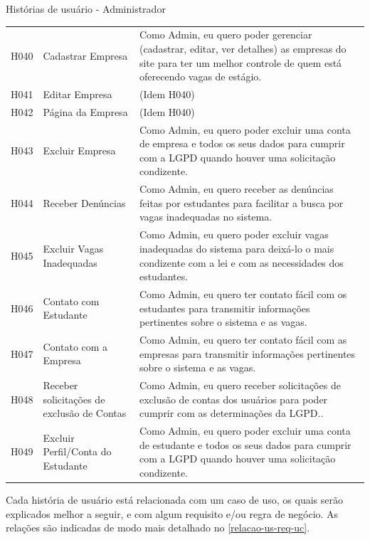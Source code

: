 \begin{quadro}[H]
	\centering
	\ABNTEXfontereduzida
	\caption{Histórias de usuário - Administrador}
	\label{user-story-admin}
	\begin{tabular}{|l|p{4 cm}|p{9 cm}|}
		\hline 
		\thead{Código} & \thead[l]{Nome} & \thead[l]{Descrição} \\
		\hline
		H040 & Cadastrar Empresa & Como Admin, eu quero poder gerenciar (cadastrar, editar, ver detalhes) as empresas do site para ter um melhor controle de quem está oferecendo vagas de estágio. \\
		\hline
		H041 & Editar Empresa & (Idem H040) \\
		\hline
		H042 & Página da Empresa & (Idem H040) \\
		\hline
		H043 & Excluir Empresa & Como Admin, eu quero poder excluir uma conta de empresa e todos os seus dados para cumprir com a LGPD quando houver uma solicitação condizente. \\
		\hline
		H044 & Receber Denúncias & Como Admin, eu quero receber as denúncias feitas por estudantes para facilitar a busca por vagas inadequadas no sistema. \\
		\hline
		H045 & Excluir Vagas Inadequadas & Como Admin, eu quero poder excluir vagas inadequadas do sistema para deixá-lo o mais condizente com a lei e com as necessidades dos estudantes. \\
		\hline
		H046 & Contato com Estudante & Como Admin, eu quero ter contato fácil com os estudantes para transmitir informações pertinentes sobre o sistema e as vagas. \\
		\hline
		H047 & Contato com a Empresa & Como Admin, eu quero ter contato fácil com as empresas para transmitir informações pertinentes sobre o sistema e as vagas. \\
		\hline
		H048 & Receber solicitações de exclusão de Contas & Como Admin, eu quero receber solicitações de exclusão de contas dos usuários para poder cumprir com as determinações da LGPD.. \\
		\hline
		H049 & Excluir Perfil/Conta do Estudante & Como Admin, eu quero poder excluir uma conta de estudante e todos os seus dados para cumprir com a LGPD quando houver uma solicitação condizente. \\
		\hline
	\end{tabular}
\end{quadro}

Cada história de usuário está relacionada com um caso de uso, os quais serão explicados melhor a seguir, e com algum requisito e/ou regra de negócio. As relações são indicadas de modo mais detalhado no \autoref{relacao-us-req-uc}.

